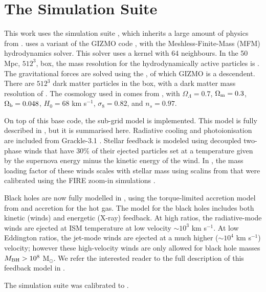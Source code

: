 \section{The \simba Simulation Suite}


This work uses the \simba simulation suite \citep{}, which inherits a large
amount of physics from \mufasa \citep{dave2016}. \simba uses a variant of the
GIZMO code \citep{hopkins2015}, with the Meshless-Finite-Mass (MFM)
hydrodynamics solver. This solver uses a  kernel with 64
neighbours. In the 50 Mpc, $512^3$, box, the mass resolution for the
hydrodynamically active particles is . The gravitational
forces are solved using the , of which GIZMO is a descendent. There are $512^3$ dark
matter particles in the box, with a dark matter mass resolution of . The cosmology used in \simba comes from \citet{planck2016}, with
$\Omega_\Lambda = 0.7$, $\Omega_{\rm m} = 0.3$, $\Omega_{\rm b} = 0.048$, $H_0
= 68$ km s$^{-1}$, $\sigma_8=0.82$, and $n_s=0.97$.

On top of this base code, the \simba sub-grid model is implemented. This model
is fully described in \citet{}, but it is summarised here. Radiative cooling
and photoionisation are included from Grackle-3.1 \citep{}. Stellar feedback is
modeled using decoupled two-phase winds that have 30\% of their ejected
particles set at a temperature given by the supernova energy minus the kinetic
energy of the wind. In \simba, the mass loading factor of these winds scales
with stellar mass using scalins from \citet{muratov2015} that were calibrated
using the FIRE zoom-in simulations \citep{}.

Black holes are now fully modelled in \simba, using the torque-limited
accretion model from \citet{anglesalcazar2017} and \citet{bondi29832} accretion
for the hot gas. The model for the black holes includes both kinetic (winds)
and energetic (X-ray) feedback. At high \citet{eddington} ratios, the
radiative-mode winds are ejected at ISM temperature at low velocity $\sim 10^3$
km s$^{-1}$. At low Eddington ratios, the jet-mode winds are ejected at a much
higher ($\sim 10^4$ km s$^{-1}$) velocity; however these high-velocity winds
are only allowed for black hole masses $M_{\rm BH} > 10^8$ M$_\odot$. We refer
the interested reader to the full description of this feedback model in
\citet{dave2018}.

The \simba simulation suite was calibrated to .

